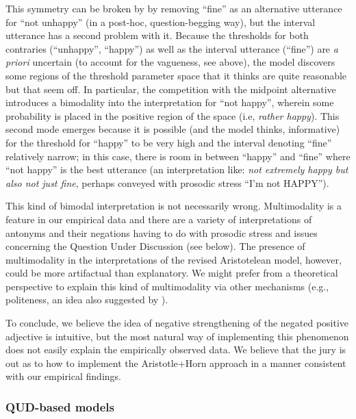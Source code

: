\documentclass[floatsintext,doc]{apa6}
\begin{document}
This symmetry can be broken by by removing ``fine'' as an alternative utterance for ``not unhappy'' (in a post-hoc, question-begging way), but the interval utterance has a second problem with it. 
Because the thresholds for both contraries (``unhappy'', ``happy'') as well as the interval utterance (``fine'') are \emph{a priori} uncertain (to account for the vagueness, see above), the model discovers some regions of the threshold parameter space that it thinks are quite reasonable but that seem off. 
In particular, the competition with the midpoint alternative introduces a bimodality into the interpretation for ``not happy'', wherein some probability is placed in the positive region of the space (i.e, \emph{rather happy}).
This second mode emerges because it is possible (and the model thinks, informative) for the threshold for ``happy'' to be very high and the interval denoting ``fine'' relatively narrow; in this case, there is room in between ``happy'' and ``fine'' where ``not happy'' is the best utterance (an interpretation like: \emph{not extremely happy but also not just fine}, perhaps conveyed with prosodic stress ``I'm not HAPPY''). 

This kind of bimodal interpretation is not necessarily wrong. Multimodality is a feature in our empirical data and there are a variety of interpretations of antonyms and their negations having to do with prosodic stress and issues concerning the Question Under Discussion (see below). 
The presence of multimodality in the interpretations of the revised Aristotelean model, however, could be more artifactual than explanatory. 
We might prefer from a theoretical perspective to explain this kind of multimodality via other mechanisms (e.g., politeness, an idea also suggested by ). 

To conclude, we believe the idea of negative strengthening of the negated positive adjective is intuitive, but the most natural way of implementing this phenomenon does not easily explain the empirically observed data. We believe that the jury is out as to how to implement the Aristotle+Horn approach in a manner consistent with our empirical findings. 


\subsubsection{QUD-based models}
\end{document}
